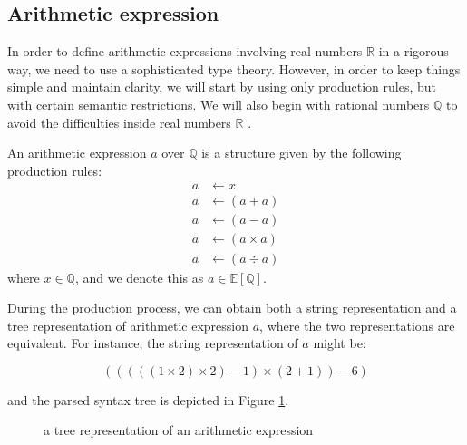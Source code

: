 
\subsection{Arithmetic expression}\label{sec:expression}

In order to define arithmetic expressions involving real numbers  $\mathbb{R}$ in a rigorous way, we need to use a sophisticated type theory.
However, in order to keep things simple and maintain clarity, we will start by using only production rules,
but with certain semantic restrictions. We will also begin with rational numbers $\mathbb{Q}$ to avoid the difficulties inside real numbers $\mathbb{R}$ .

\begin{definition}\label{def:arithmetic-expression}
    An arithmetic expression $a$ over $\mathbb{Q}$ is a structure given by the following production rules:
\begin{equation}\label{eq:productionrule}
\begin{aligned}
a &\longleftarrow x\\
a &\longleftarrow ( a + a )\\
a &\longleftarrow ( a - a )\\
a &\longleftarrow ( a \times a )\\
a &\longleftarrow ( a \div a )
\end{aligned}
\end{equation}
    where $x \in \mathbb{Q}$, and we denote this as $a \in \mathbb{E} \left [\mathbb{Q} \right ]$.

\end{definition}

During the production process, we can obtain both a string representation and a tree representation of arithmetic expression $a$,
where the two representations are equivalent. For instance, the string representation of $a$ might be:

\begin{equation}
(((((1 \times 2) \times 2) - 1) \times (2 + 1)) - 6)
\end{equation}

and the parsed syntax tree is depicted in Figure \ref{fig:syntaxtree}.

\begin{figure}[ht]
\centering
{}
\caption{a tree representation of an arithmetic expression}\label{fig:syntaxtree}
\end{figure}


